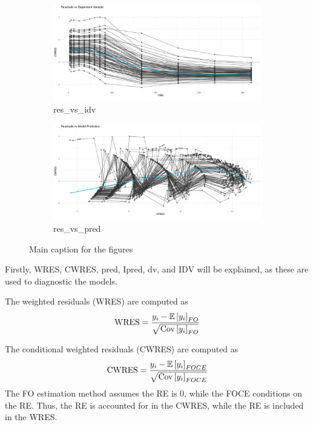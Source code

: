 \begin{figure}
    \begin{subfigure}[b]{0.45\linewidth}
        \centering
        \includegraphics[width=\linewidth]{fig/img/Xpose/res_vs_idv.pdf}
        \caption{res\_vs\_idv}
        \label{fig:res_vs_idv}
    \end{subfigure}
    \hfill
    \begin{subfigure}[b]{0.45\linewidth}
        \centering
        \includegraphics[width=\linewidth]{fig/img/Xpose/res_vs_pred.pdf}
        \caption{res\_vs\_pred}
        \label{fig:res_vs_pred}
    \end{subfigure}

    \caption{Main caption for the figures}
    \label{fig:all_figures}
\end{figure}
Firstly, WRES, CWRES, pred, Ipred, dv, and IDV will be explained, as these are used to diagnostic the models. 

The weighted residuals (WRES) are computed as
\begin{align*}
    \text{WRES} = \frac{y_i - \mathbb{E}\left[{y_i}\right]_{FO}}{\sqrt{\text{Cov}\left[{y_i}\right]_{FO}}}
\end{align*}

The conditional weighted residuals (CWRES) are computed as
\begin{align*}
    \text{CWRES} = \frac{y_i - \mathbb{E}\left[{y_i}\right]_{FOCE}}{\sqrt{\text{Cov}\left[{y_i}\right]_{FOCE}}}
\end{align*}
The FO estimation method assumes the RE is $0$, while the FOCE conditions on the RE. Thus, the RE is accounted for in the CWRES, while the RE is included in the WRES. 

